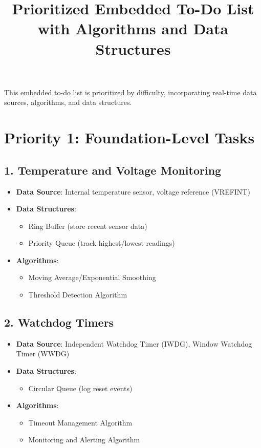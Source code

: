 \documentclass{article}
\title{Prioritized Embedded To-Do List with Algorithms and Data Structures}
\author{}
\date{}
\begin{document}
\maketitle

This embedded to-do list is prioritized by difficulty, incorporating real-time data sources, algorithms, and data structures.

\section{Priority 1: Foundation-Level Tasks}

\subsection{1. Temperature and Voltage Monitoring}
\begin{itemize}
    \item \textbf{Data Source}: Internal temperature sensor, voltage reference (VREFINT)
    \item \textbf{Data Structures}: 
    \begin{itemize}
        \item Ring Buffer (store recent sensor data)
        \item Priority Queue (track highest/lowest readings)
    \end{itemize}
    \item \textbf{Algorithms}:
    \begin{itemize}
        \item Moving Average/Exponential Smoothing
        \item Threshold Detection Algorithm
    \end{itemize}
\end{itemize}

\subsection{2. Watchdog Timers}
\begin{itemize}
    \item \textbf{Data Source}: Independent Watchdog Timer (IWDG), Window Watchdog Timer (WWDG)
    \item \textbf{Data Structures}: 
    \begin{itemize}
        \item Circular Queue (log reset events)
    \end{itemize}
    \item \textbf{Algorithms}:
    \begin{itemize}
        \item Timeout Management Algorithm
        \item Monitoring and Alerting Algorithm
    \end{itemize}
\end{itemize}
\end{document}
